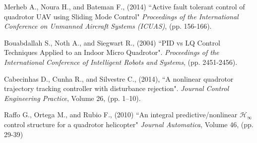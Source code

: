 \documentclass[12pt]{article}
\begin{document}
 
\begin{thebibliography}{100} %
 Merheb A., Noura H., and Bateman F., (2014)
``Active fault tolerant control of quadrotor UAV using Sliding Mode Control"
\emph{Proceedings of the International Conference on Unmanned Aircraft Systems (ICUAS)},
(pp. 156-166).

 Bouabdallah S., Noth A., and Siegwart R., (2004) 
``PID vs LQ Control Techniques Applied to an Indoor Micro Quadrotor". 
\emph{Proceedings of the International Conference of Intelligent Robots and Systems}, 
(pp. 2451-2456).

 Cabecinhas D., Cunha R., and Silvestre C., (2014),
``A nonlinear quadrotor trajectory tracking controller with disturbance rejection".
\emph{Journal Control Engineering Practice}, Volume 26, (pp. 1–10).

 Raffo G., Ortega M., and Rubio F., (2010)
``An integral predictive/nonlinear $\mathcal{H} _\infty$ control structure for a quadrotor helicopter"
\emph{Journal Automatica}, Volume 46, (pp. 29-39)
\end{thebibliography}
\end{document}
